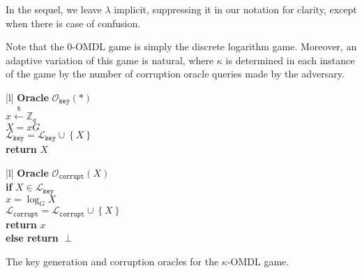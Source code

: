 \documentclass[11pt]{article}
\theoremstyle{definition}
\newcommand{\Zq}{\mathbb{Z}_q}
\newcommand{\secpar}{\lambda}
\newcommand{\corruptionOracle}{\mathcal{O}_{\texttt{corrupt}}}
\newcommand{\keyOracle}{\mathcal{O}_{\texttt{key}}}
\newcommand{\challengeKeySet}{\mathcal{L}_{\texttt{key}}}
\newcommand{\corruptedKeySet}{\mathcal{L}_{\texttt{corrupt}}}
\newcommand{\lsamp}{\xleftarrow{\$}}
\begin{document}
In the sequel, we leave $\secpar$ implicit, suppressing it in our notation for clarity, except when there is case of confusion.

Note that the $0$-OMDL game is simply the discrete logarithm game. Moreover, an adaptive variation of this game is natural, where  $\kappa$ is determined in each instance of the game by the number of corruption oracle queries made by the adversary.



\begin{oracle}
    \centering
    \begin{suboracle}[ht]{0.2\textwidth}
        \begin{tabular}{|l|}
        \hline
          {\textbf{Oracle} $\keyOracle(\ast)$} \\
        \hline 
        $x \lsamp \Zq$ \\
        $X=xG$ \\
        $\challengeKeySet = \challengeKeySet \cup \left\{X\right\}$ \\
        \textbf{return } $X$ \\
        \hline
        \end{tabular}
    \end{suboracle}
    \hspace{1em}
    \begin{suboracle}[ht]{0.3\textwidth}
        \begin{tabular}{|l|}
        \hline
          {\textbf{Oracle} $\corruptionOracle(X)$} \\
        \hline 
        \textbf{if} $X \in \challengeKeySet$ \\ \quad \quad
        $x=\log_G{X}$ \\ \quad \quad 
        $\corruptedKeySet = \corruptedKeySet \cup \left\{X\right\}$ \\ \quad \quad
        \textbf{return} $x$ \\
        \textbf{else return} $\perp$ \\
        \hline
        \end{tabular}
    \end{suboracle}
\caption{The key generation and corruption oracles for the $\kappa$-OMDL game.}
\label{oracle:OMDL}
\end{oracle}
\end{document}
